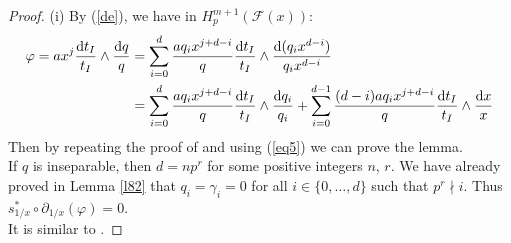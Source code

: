 \documentclass[times,10pt]{amsart}
\newcommand{\dd}{{\rm d}}
\newcommand{\F}{\ensuremath{\mathcal{F}}}
\renewcommand{\phi}{\varphi}
\begin{document}
 \begin{proof}
     (i)  By (\ref{de}), we have in $H_p^{m+1}(\F(x))$: \begin{align*}
         \phi= ax^j \frac{\dd t_I}{t_I}\wedge \frac{\dd q}{q}&= \sum_{i=0}^{d}  \frac{aq_i x^{j+d-i}}{q}\frac{\dd t_I}{t_I}\wedge \frac{\dd (q_ix^{d-i})}{q_ix^{d-i}}\\&= \sum_{i=0}^{d}  \frac{aq_i x^{j+d-i}}{q}\frac{\dd t_I}{t_I}\wedge \frac{\dd q_i}{q_i}+ \sum_{i=0}^{d-1}  \frac{(d-i)aq_i x^{j+d-i}}{q}\frac{\dd t_I}{t_I}\wedge \frac{\dd x}{x}
     \end{align*} Then by repeating the proof of \cite[Lemma 4.3, (i)]{Laghribi-Maiti} and using (\ref{eq5}) we can prove the lemma.\\   

     If  $q$ is inseparable, then $d=np^r$ for some positive integers $n$, $r$.   We have already proved in Lemma \ref{l82} that   $ q_i=\gamma_i=0$  for all $i\in \{0,\ldots,d\}$ such that  $p^r\nmid i$. Thus $ s^*_{1/x}\circ \partial_{1/x}(\phi)=0$.\\
     
       It is similar to \cite[Lemma 4.3, (ii)]{Laghribi-Maiti}.

     
 \end{proof}
\end{document}
